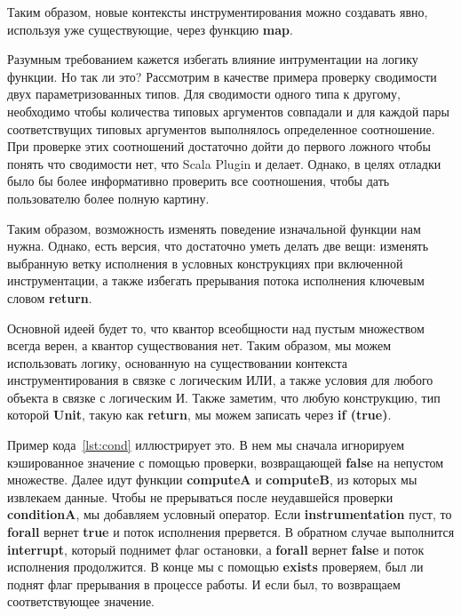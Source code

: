 Таким образом, новые контексты инструментирования можно создавать явно,
используя уже существующие, через функцию \textbf{map}.


Разумным требованием кажется избегать влияние интрументации на
логику функции.
Но так ли это?
Рассмотрим в качестве примера проверку сводимости двух параметризованных типов.
Для сводимости одного типа к другому, необходимо чтобы количества типовых аргументов
совпадали и для каждой пары соответствущих типовых аргументов выполнялось
определенное соотношение.
При проверке этих соотношений достаточно дойти до первого ложного чтобы понять что
сводимости нет, что Scala Plugin и делает.
Однако, в целях отладки было бы более информативно проверить все соотношения,
чтобы дать пользователю более полную картину.

Таким образом, возможность изменять поведение изначальной функции нам нужна.
Однако, есть версия, что достаточно уметь делать две вещи:
изменять выбранную ветку исполнения в условных конструкциях при включенной
инструментации, а также избегать прерывания потока исполнения ключевым
словом \textbf{return}.

Основной идеей будет то, что квантор всеобщности над пустым множеством всегда
верен, а квантор существования нет.
Таким образом, мы можем использовать логику, основанную на существовании контекста
инструментирования в связке с логическим ИЛИ, а также условия для любого объекта
в связке с логическим И.
Также заметим, что любую конструкцию, тип которой \textbf{Unit}, такую как
\textbf{return}, мы можем записать через \textbf{if (true)}.

Пример кода~\ref{lst:cond} иллюстрирует это.
В нем мы сначала игнорируем кэшированное значение с помощью проверки,
возвращающей \textbf{false} на непустом множестве.
Далее идут функции \textbf{computeA} и \textbf{computeB}, из которых мы извлекаем данные.
Чтобы не прерываться после неудавшейся проверки \textbf{conditionA}, мы добавляем
условный оператор.
Если \textbf{instrumentation} пуст, то \textbf{forall} вернет \textbf{true} и
поток исполнения прервется.
В обратном случае выполнится \textbf{interrupt}, который поднимет флаг остановки, а
\textbf{forall} вернет \textbf{false} и поток исполнения продолжится.
В конце мы с помощью \textbf{exists} проверяем, был ли поднят флаг прерывания в
процессе работы.
И если был, то возвращаем соответствующее значение.

